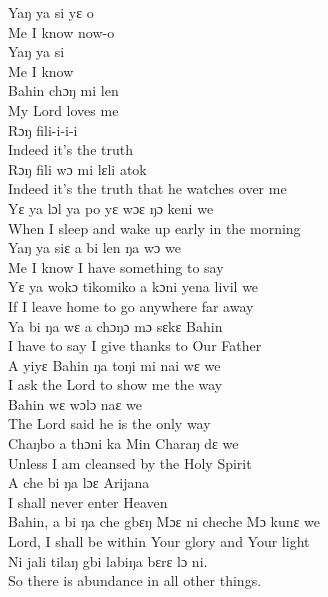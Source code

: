 Yaŋ ya si yɛ o\\
Me I know now-o\\

Yaŋ ya si\\
Me I know\\

Bahin chɔŋ mi len\\
My Lord loves me\\

Rɔŋ fili-i-i-i\\
Indeed it's the truth\\

Rɔŋ fili wɔ mi lɛli atok\\
Indeed it's the truth that he watches over me\\

Yɛ ya lɔl ya po yɛ wɔɛ ŋɔ keni we\\
When I sleep and wake up early in the morning\\

Yaŋ ya siɛ a bi len ŋa wɔ we\\
Me I know I have something to say\\

Yɛ ya wokɔ tikomiko a kɔni yena livil we\\
If I leave home to go anywhere far away\\

Ya bi ŋa wɛ a chɔŋɔ mɔ sɛkɛ Bahin\\
I have to say I give thanks to Our Father\\

A yiyɛ Bahin ŋa toŋi mi nai wɛ we\\
I ask the Lord to show me the way\\

Bahin wɛ wɔlɔ naɛ we\\
The Lord said he is the only way\\

Chaŋbo a thɔni ka Min Charaŋ dɛ we\\
Unless I am cleansed by the Holy Spirit\\

A che bi ŋa lɔɛ Arijana\\
I shall never enter Heaven\\

Bahin, a bi ŋa che gbɛŋ Mɔɛ ni cheche Mɔ kunɛ we\\
Lord, I shall be within Your glory and Your light\\

Ni jali tilaŋ gbi labiŋa bɛrɛ lɔ ni.\\
So there is abundance in all other things.\\

